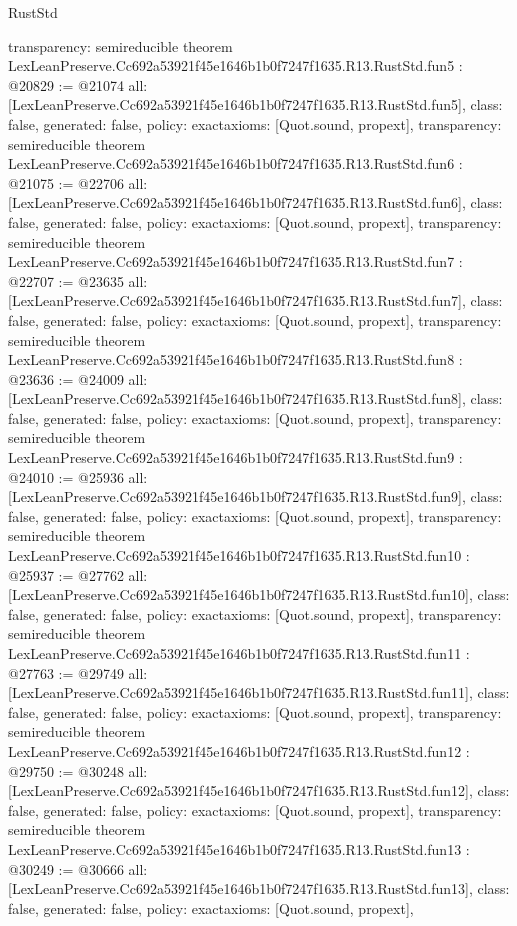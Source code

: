 \begin{lexlean}{RustStd}
\begin{coremodule}
{  transparency: semireducible
}
theorem LexLeanPreserve.Cc692a53921f45e1646b1b0f7247f1635.R13.RustStd.fun5 : @20829 := @21074 {
  all: [LexLeanPreserve.Cc692a53921f45e1646b1b0f7247f1635.R13.RustStd.fun5],
  class: false,
  generated: false,
  policy: exact{axioms: [Quot.sound, propext]},
  transparency: semireducible
}
theorem LexLeanPreserve.Cc692a53921f45e1646b1b0f7247f1635.R13.RustStd.fun6 : @21075 := @22706 {
  all: [LexLeanPreserve.Cc692a53921f45e1646b1b0f7247f1635.R13.RustStd.fun6],
  class: false,
  generated: false,
  policy: exact{axioms: [Quot.sound, propext]},
  transparency: semireducible
}
theorem LexLeanPreserve.Cc692a53921f45e1646b1b0f7247f1635.R13.RustStd.fun7 : @22707 := @23635 {
  all: [LexLeanPreserve.Cc692a53921f45e1646b1b0f7247f1635.R13.RustStd.fun7],
  class: false,
  generated: false,
  policy: exact{axioms: [Quot.sound, propext]},
  transparency: semireducible
}
theorem LexLeanPreserve.Cc692a53921f45e1646b1b0f7247f1635.R13.RustStd.fun8 : @23636 := @24009 {
  all: [LexLeanPreserve.Cc692a53921f45e1646b1b0f7247f1635.R13.RustStd.fun8],
  class: false,
  generated: false,
  policy: exact{axioms: [Quot.sound, propext]},
  transparency: semireducible
}
theorem LexLeanPreserve.Cc692a53921f45e1646b1b0f7247f1635.R13.RustStd.fun9 : @24010 := @25936 {
  all: [LexLeanPreserve.Cc692a53921f45e1646b1b0f7247f1635.R13.RustStd.fun9],
  class: false,
  generated: false,
  policy: exact{axioms: [Quot.sound, propext]},
  transparency: semireducible
}
theorem LexLeanPreserve.Cc692a53921f45e1646b1b0f7247f1635.R13.RustStd.fun10 : @25937 := @27762 {
  all: [LexLeanPreserve.Cc692a53921f45e1646b1b0f7247f1635.R13.RustStd.fun10],
  class: false,
  generated: false,
  policy: exact{axioms: [Quot.sound, propext]},
  transparency: semireducible
}
theorem LexLeanPreserve.Cc692a53921f45e1646b1b0f7247f1635.R13.RustStd.fun11 : @27763 := @29749 {
  all: [LexLeanPreserve.Cc692a53921f45e1646b1b0f7247f1635.R13.RustStd.fun11],
  class: false,
  generated: false,
  policy: exact{axioms: [Quot.sound, propext]},
  transparency: semireducible
}
theorem LexLeanPreserve.Cc692a53921f45e1646b1b0f7247f1635.R13.RustStd.fun12 : @29750 := @30248 {
  all: [LexLeanPreserve.Cc692a53921f45e1646b1b0f7247f1635.R13.RustStd.fun12],
  class: false,
  generated: false,
  policy: exact{axioms: [Quot.sound, propext]},
  transparency: semireducible
}
theorem LexLeanPreserve.Cc692a53921f45e1646b1b0f7247f1635.R13.RustStd.fun13 : @30249 := @30666 {
  all: [LexLeanPreserve.Cc692a53921f45e1646b1b0f7247f1635.R13.RustStd.fun13],
  class: false,
  generated: false,
  policy: exact{axioms: [Quot.sound, propext]},
}
\end{coremodule}
\end{lexlean}
